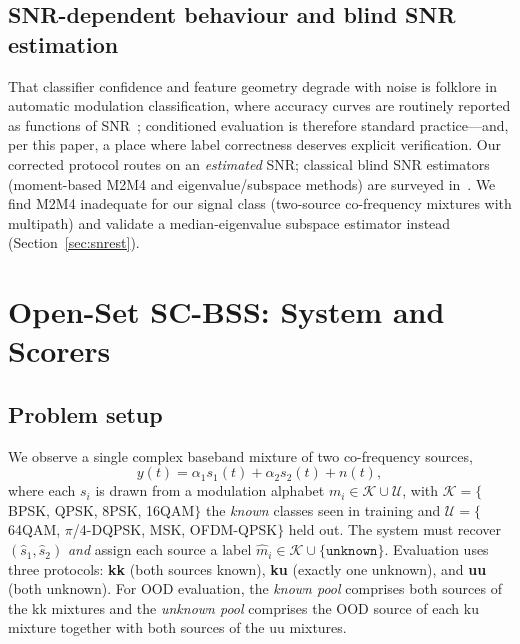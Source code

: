 \documentclass[review,12pt]{elsarticle}
\begin{document}
\subsection{SNR-dependent behaviour and blind SNR estimation}

That classifier confidence and feature geometry degrade with noise is
folklore in automatic modulation classification, where accuracy curves
are routinely reported as functions of
SNR~\cite{proakis2008digital,oshea2017intro}; conditioned evaluation is
therefore standard practice---and, per this paper, a place where label
correctness deserves explicit verification. Our corrected protocol
routes on an \emph{estimated} SNR; classical blind SNR estimators
(moment-based M2M4 and eigenvalue/subspace methods) are surveyed
in~\cite{pauluzzi2000snr}. We find M2M4 inadequate for our signal class
(two-source co-frequency mixtures with multipath) and validate a
median-eigenvalue subspace estimator instead
(Section~\ref{sec:snrest}).

\section{Open-Set SC-BSS: System and Scorers}
\label{sec:method}

\subsection{Problem setup}
\label{sec:setup}

We observe a single complex baseband mixture of two co-frequency
sources,
\begin{equation}
  y(t) = \alpha_1 s_1(t) + \alpha_2 s_2(t) + n(t),
  \label{eq:mix}
\end{equation}
where each $s_i$ is drawn from a modulation alphabet
$m_i \in \mathcal{K} \cup \mathcal{U}$, with
$\mathcal{K} = \{$BPSK, QPSK, 8PSK, 16QAM$\}$ the \emph{known} classes
seen in training and
$\mathcal{U} = \{$64QAM, $\pi$/4-DQPSK, MSK, OFDM-QPSK$\}$ held out.
The system must recover $(\hat{s}_1, \hat{s}_2)$ \emph{and} assign each
source a label
$\hat{m}_i \in \mathcal{K} \cup \{\texttt{unknown}\}$.
Evaluation uses three protocols: \textbf{kk} (both sources known),
\textbf{ku} (exactly one unknown), and \textbf{uu} (both unknown).
For OOD evaluation, the \emph{known pool} comprises both sources of the
kk mixtures and the \emph{unknown pool} comprises the OOD source of
each ku mixture together with both sources of the uu mixtures.
\end{document}
